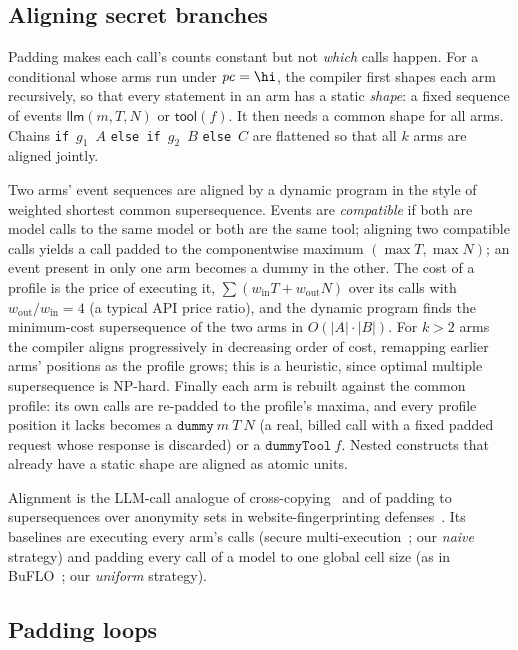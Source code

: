 \subsection{Aligning secret branches}\label{sec:align}

Padding makes each call's counts constant but not \emph{which} calls happen. For a conditional whose arms run under $\mathit{pc} = \hi$, the compiler first shapes each arm recursively, so that every statement in an arm has a static \emph{shape}: a fixed sequence of events $\mathsf{llm}(m,T,N)$ or $\mathsf{tool}(f)$. It then needs a common shape for all arms. Chains \texttt{if}~$g_1$~$A$ \texttt{else if}~$g_2$~$B$ \texttt{else}~$C$ are flattened so that all $k$ arms are aligned jointly.

Two arms' event sequences are aligned by a dynamic program in the style of weighted shortest common supersequence. Events are \emph{compatible} if both are model calls to the same model or both are the same tool; aligning two compatible calls yields a call padded to the componentwise maximum $(\max T, \max N)$; an event present in only one arm becomes a dummy in the other. The cost of a profile is the price of executing it, $\sum (w_{\mathrm{in}} T + w_{\mathrm{out}} N)$ over its calls with $w_{\mathrm{out}}/w_{\mathrm{in}} = 4$ (a typical API price ratio), and the dynamic program finds the minimum-cost supersequence of the two arms in $O(|A|\cdot|B|)$. For $k>2$ arms the compiler aligns progressively in decreasing order of cost, remapping earlier arms' positions as the profile grows; this is a heuristic, since optimal multiple supersequence is NP-hard. Finally each arm is rebuilt against the common profile: its own calls are re-padded to the profile's maxima, and every profile position it lacks becomes a $\texttt{dummy}\ m\ T\ N$ (a real, billed call with a fixed padded request whose response is discarded) or a $\texttt{dummyTool}\ f$. Nested constructs that already have a static shape are aligned as atomic units.

Alignment is the LLM-call analogue of cross-copying~\cite{agat2000transforming} and of padding to supersequences over anonymity sets in website-fingerprinting defenses~\cite{wang2014supersequence}. Its baselines are executing every arm's calls (secure multi-execution~\cite{devriese2010sme}; our \emph{naive} strategy) and padding every call of a model to one global cell size (as in BuFLO~\cite{dyer2012peekaboo}; our \emph{uniform} strategy).

\subsection{Padding loops}\label{sec:loops}


